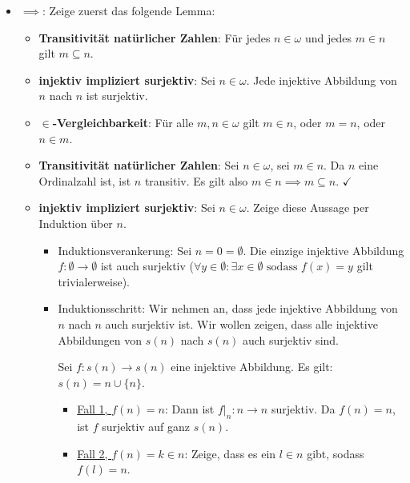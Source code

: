 \documentclass[12pt]{article}
\begin{document}
\begin{itemize}
    \item \underline{$\implies$}: Zeige zuerst das folgende Lemma:
    
    \begin{lemma*}{}{}
        \begin{itemize}
            \item \textbf{Transitivität natürlicher Zahlen}: Für jedes $n \in \omega$ und jedes $m \in n$ gilt $m \subseteq n$.
            \item \textbf{injektiv impliziert surjektiv}: Sei $n \in \omega$. Jede injektive Abbildung von $n$ nach $n$ ist surjektiv.
            \item \textbf{$\in$-Vergleichbarkeit}: Für alle $m, n \in \omega$ gilt $m \in n$, oder $m = n$, oder $n \in m$.
        \end{itemize}
    \end{lemma*}

    \begin{itemize}
        \item \textbf{Transitivität natürlicher Zahlen}: Sei $n \in \omega$, sei $m \in n$. Da $n$ eine Ordinalzahl ist, ist $n$ transitiv. Es gilt also $m \in n \implies m \subseteq n$. $\checkmark$
        \item \textbf{injektiv impliziert surjektiv}: Sei $n \in \omega$. Zeige diese Aussage per Induktion über $n$.
        \begin{itemize}
            \item Induktionsverankerung: Sei $n = 0 = \emptyset$. Die einzige injektive Abbildung $f: \emptyset \rightarrow \emptyset$ ist auch surjektiv ($\forall y \in \emptyset : \exists x \in \emptyset \text{ sodass } f(x) = y$ gilt trivialerweise).
            \item Induktionsschritt: Wir nehmen an, dass jede injektive Abbildung von $n$ nach $n$ auch surjektiv ist. Wir wollen zeigen, dass alle injektive Abbildungen von $s(n)$ nach $s(n)$ auch surjektiv sind.
            
            Sei $f: s(n) \rightarrow s(n)$ eine injektive Abbildung. Es gilt: $s(n) = n \cup \{n\}$. 
            \begin{itemize}
                \item \underline{Fall 1, $f(n) = n$}: Dann ist $f|_n: n \rightarrow n$ surjektiv. Da $f(n) = n$, ist $f$ surjektiv auf ganz $s(n)$.
                \item \underline{Fall 2, $f(n) = k \in n$}: Zeige, dass es ein $l \in n$ gibt, sodass $f(l) = n$. 
                

\end{itemize}
\end{itemize}
\end{itemize}
\end{itemize}
\end{document}
